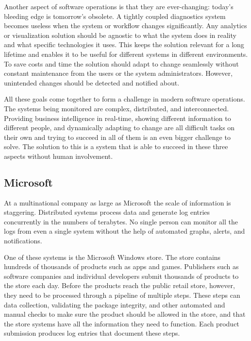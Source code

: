 Another aspect of software operations is that they are ever-changing: today's bleeding edge is tomorrow's obsolete. 
A tightly coupled diagnostics system becomes useless when the system or workflow changes significantly. 
Any analytics or visualization solution should be agnostic to what the system does in reality and what specific technologies it uses. 
This keeps the solution relevant for a long lifetime and enables it to be useful for different systems in different environments. 
To save costs and time the solution should adapt to change seamlessly without constant maintenance from the users or the system administrators. However, unintended changes should be detected and notified about.

All these goals come together to form a challenge in modern software operations.
The systems being monitored are complex, distributed, and interconnected.
Providing business intelligence in real-time, showing different information to different people, and dynamically adapting to change are all difficult tasks on their own and trying to succeed in all of them is an even bigger challenge to solve.
The solution to this is a system that is able to succeed in these three aspects without human involvement.

\subsection{Microsoft}
At a multinational company as large as Microsoft the scale of information is staggering.
Distributed systems process data and generate log entries concurrently in the numbers of terabytes.
No single person can monitor all the logs from even a single system without the help of automated
graphs, alerts, and notifications.  

One of these systems is the Microsoft Windows store. The store contains hundreds of thousands of products
such as apps and games. Publishers such as software companies and individual developers submit thousands of 
products to the store each day. Before the products reach the public retail store, however, they need to be processed
through a pipeline of multiple steps. These steps can data collection, validating the package integrity, and
other automated and manual checks to make sure the product should be allowed in the store,
and that the store systems have all the information they need to function.
Each product submission produces log entries that document these steps.

